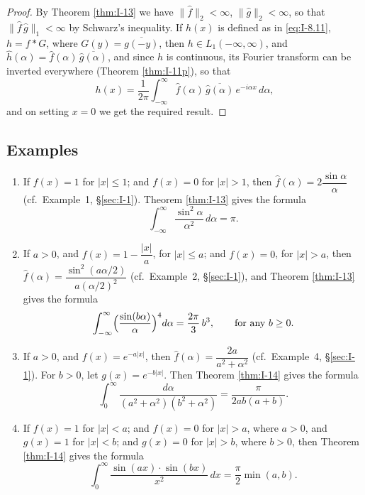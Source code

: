 \begin{proof}
By Theorem \ref{thm:I-13} we have $\|\widehat f\|_2<\infty$, $\|\widehat g\|_2<\infty$, so that $\|\widehat f\,\widehat g\|_1<\infty$ by Schwarz's inequality. If $h(x)$ is defined as in \eqref{eq:I-8.11}, $h=f*G$, where $G(y)=\overline{g(-y)}$, then $h\in L_1(-\infty,\infty)$, and $\hat h(\alpha)=\widehat f(\alpha)\,\overline{\widehat g(\alpha)}$, and since $h$ is continuous, its Fourier transform can be inverted everywhere (Theorem \ref{thm:I-11p}), so that
\begin{equation*}
h(x)=\frac{1}{2\pi}\int_{-\infty}^{\infty}\widehat f(\alpha)\,\overline{\widehat g(\alpha)}\,e^{-i\alpha x}\,d\alpha,
\end{equation*}
and on setting $x=0$ we get the required result.
\end{proof}

\subsection*{Examples}
\begin{enumerate}[label=\arabic*.,ref=\arabic*]
\item If $f(x)=1$ for $|x|\le 1$; and $f(x)=0$ for $|x|>1$, then
$\widehat f(\alpha)=2\dfrac{\sin\alpha}{\alpha}$ (cf.\ Example~1, \S\ref{sec:I-1}). Theorem \ref{thm:I-13} gives the formula
\begin{equation*}
\int_{-\infty}^{\infty}\frac{\sin^{2}\alpha}{\alpha^{2}}\,d\alpha=\pi.
\end{equation*}

\item If $a>0$, and $f(x)=1-\dfrac{|x|}{a}$, for $|x|\le a$; and $f(x)=0$, for $|x|>a$, then $\widehat f(\alpha)=\dfrac{\sin^{2}(a\alpha/2)}{a(\alpha/2)^{2}}$ (cf.\ Example~2, \S\ref{sec:I-1}), and Theorem \ref{thm:I-13} gives the formula
\begin{equation*}
\int_{-\infty}^{\infty}\Bigl(\frac{\sin(b\alpha)}{\alpha}\Bigr)^{4}d\alpha=\frac{2\pi}{3}\,b^{3},\qquad\text{for any }b\ge 0.
\end{equation*}

\item If $a>0$, and $f(x)=e^{-a|x|}$, then $\widehat f(\alpha)=\dfrac{2a}{a^{2}+\alpha^{2}}$ (cf.\ Example~4, \S\ref{sec:I-1}). For $b>0$, let $g(x)=e^{-b|x|}$. Then Theorem \ref{thm:I-14} gives the formula
\begin{equation*}
\int_{0}^{\infty}\frac{d\alpha}{(a^{2}+\alpha^{2})(b^{2}+\alpha^{2})}=\frac{\pi}{2ab(a+b)}.
\end{equation*}

\item If $f(x)=1$ for $|x|<a$; and $f(x)=0$ for $|x|>a$, where $a>0$, and $g(x)=1$ for $|x|<b$; and $g(x)=0$ for $|x|>b$, where $b>0$, then Theorem \ref{thm:I-14} gives the formula
\begin{equation*}
\int_{0}^{\infty}\frac{\sin(ax)\cdot\sin(bx)}{x^{2}}\,dx=\frac{\pi}{2}\min(a,b).
\end{equation*}
\end{enumerate}


